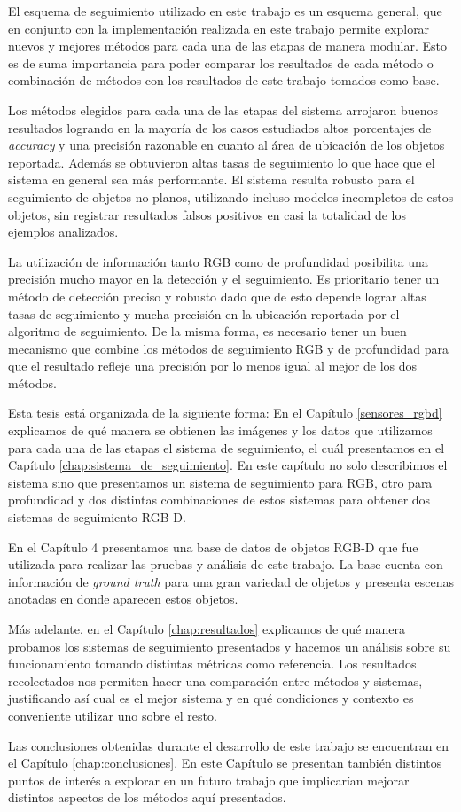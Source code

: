 El esquema de seguimiento utilizado en este trabajo es un esquema general, que en conjunto con la implementación realizada en este trabajo permite explorar nuevos y mejores métodos para cada una de las etapas de manera modular. Esto es de suma importancia para poder comparar los resultados de cada método o combinación de métodos con los resultados de este trabajo tomados como base.

Los métodos elegidos para cada una de las etapas del sistema arrojaron buenos resultados logrando en la mayoría de los casos estudiados altos porcentajes de \textit{accuracy} y una precisión razonable en cuanto al área de ubicación de los objetos reportada. Además se obtuvieron altas tasas de seguimiento lo que hace que el sistema en general sea más performante. El sistema resulta robusto para el seguimiento de objetos no planos, utilizando incluso modelos incompletos de estos objetos, sin registrar resultados falsos positivos en casi la totalidad de los ejemplos analizados.

La utilización de información tanto RGB como de profundidad posibilita una precisión mucho mayor en la detección y el seguimiento. Es prioritario tener un método de detección preciso y robusto dado que de esto depende lograr altas tasas de seguimiento y mucha precisión en la ubicación reportada por el algoritmo de seguimiento. De la misma forma, es necesario tener un buen mecanismo que combine los métodos de seguimiento RGB y de profundidad para que el resultado refleje una precisión por lo menos igual al mejor de los dos métodos.

Esta tesis está organizada de la siguiente forma: En el Capítulo \ref{sensores_rgbd} explicamos de qué manera se obtienen las imágenes y los datos que utilizamos para cada una de las etapas el sistema de seguimiento, el cuál presentamos en el Capítulo \ref{chap:sistema_de_seguimiento}. En este capítulo no solo describimos el sistema sino que presentamos un sistema de seguimiento para RGB, otro para profundidad y dos distintas combinaciones de estos sistemas para obtener dos sistemas de seguimiento RGB-D.

En el Capítulo 4 presentamos una base de datos de objetos RGB-D que fue utilizada para realizar las pruebas y análisis de este trabajo. La base cuenta con información de \textit{ground truth} para una gran variedad de objetos y presenta escenas anotadas en donde aparecen estos objetos.

Más adelante, en el Capítulo \ref{chap:resultados} explicamos de qué manera probamos los sistemas de seguimiento presentados y hacemos un análisis sobre su funcionamiento tomando distintas métricas como referencia. Los resultados recolectados nos permiten hacer una comparación entre métodos y sistemas, justificando así cual es el mejor sistema y en qué condiciones y contexto es conveniente utilizar uno sobre el resto.

Las conclusiones obtenidas durante el desarrollo de este trabajo se encuentran en el Capítulo \ref{chap:conclusiones}. En este Capítulo se presentan también distintos puntos de interés a explorar en un futuro trabajo que implicarían mejorar distintos aspectos de los métodos aquí presentados.
